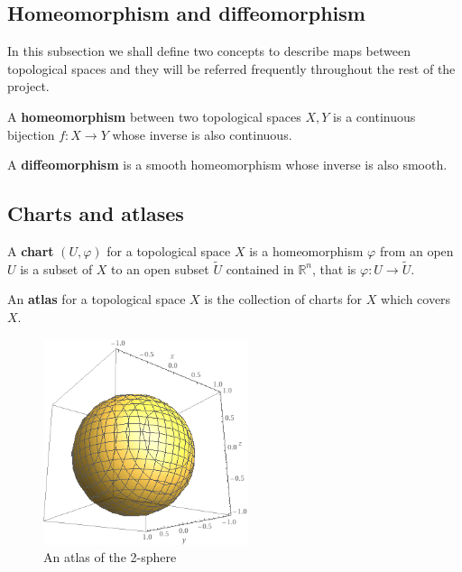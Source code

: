 \documentclass[12pt,twoside]{article}
\newcommand{\rn}{$\mathbb{R}^n$}
\begin{document}
\subsection{Homeomorphism and diffeomorphism}
In this subsection we shall define two concepts to describe maps between topological spaces and they will be referred frequently throughout the rest of the project.
\begin{definition}
A \textbf{homeomorphism} between two topological spaces $X,Y$ is a continuous bijection $f: X \rightarrow Y$ whose inverse is also continuous.
\end{definition}

\begin{definition}
A \textbf{diffeomorphism} is a smooth homeomorphism whose inverse is also smooth.
\end{definition}

\subsection{Charts and atlases}

\begin{definition}
A \textbf{chart} $(U,\varphi)$ for a topological space $X$ is a homeomorphism $\varphi$ from an open $U$ is a subset of $X$ to an open subset $\tilde{U}$ contained in \rn, that is $\varphi : U \rightarrow \tilde{U}$.
\end{definition}

\begin{definition}
An \textbf{atlas} for a topological space $X$ is the collection of charts for $X$ which covers $X$.
\end{definition}

\begin{figure}[tb]
\centering
\includegraphics[width=60mm]{3d sphere.png} 
\caption{An atlas of the 2-sphere}
\end{figure}
\end{document}
